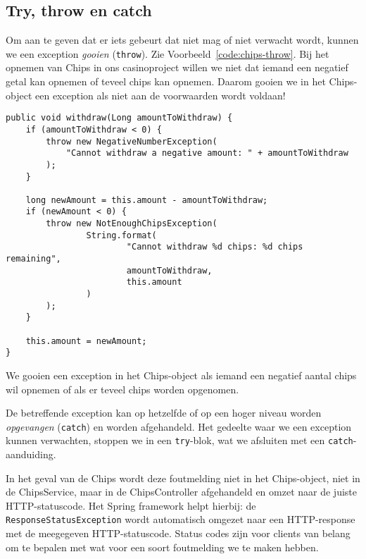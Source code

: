 \subsection{Try, throw en catch}
Om aan te geven dat er iets gebeurt dat niet mag of niet verwacht wordt, kunnen we een
exception \textit{gooien} (\texttt{throw}). Zie Voorbeeld~\ref{code:chips-throw}.
Bij het opnemen van Chips in ons casinoproject willen we niet dat iemand 
een negatief getal kan opnemen of teveel chips kan opnemen. Daarom gooien we in 
het Chips-object een exception als niet aan de voorwaarden wordt voldaan! 

\begin{listing}[H]
\begin{verbatim}
public void withdraw(Long amountToWithdraw) {
    if (amountToWithdraw < 0) {
        throw new NegativeNumberException(
            "Cannot withdraw a negative amount: " + amountToWithdraw
        );
    }

    long newAmount = this.amount - amountToWithdraw;
    if (newAmount < 0) {
        throw new NotEnoughChipsException(
                String.format(
                        "Cannot withdraw %d chips: %d chips remaining",
                        amountToWithdraw,
                        this.amount
                )
        );
    }

    this.amount = newAmount;
}
\end{verbatim}
\caption{We gooien een exception in het Chips-object als iemand een negatief aantal chips 
wil opnemen of als er teveel chips worden opgenomen.}
\label{code:chips-throw}
\end{listing}

De betreffende exception kan op hetzelfde 
of op een hoger niveau worden \textit{opgevangen} (\texttt{catch}) en worden afgehandeld.
Het gedeelte waar we een exception kunnen verwachten, stoppen we in een \texttt{try}-blok,
wat we afsluiten met een \texttt{catch}-aanduiding.

In het geval van de Chips wordt deze foutmelding niet in het Chips-object,
niet in de ChipsService, maar in de ChipsController afgehandeld en omzet naar 
de juiste HTTP-statuscode. Het Spring framework helpt hierbij: 
de \texttt{ResponseStatusException} wordt automatisch omgezet naar een HTTP-response met 
de meegegeven HTTP-statuscode. Status codes zijn voor clients van belang om te bepalen 
met wat voor een soort foutmelding we te maken hebben.

